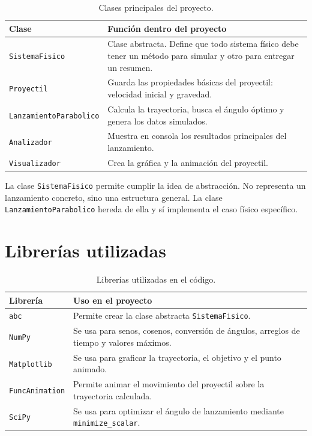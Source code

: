 \documentclass[12pt,letterpaper]{article}
\begin{document}
\begin{table}[H]
\centering
\begin{tabular}{p{4.2cm}p{10cm}}
\toprule
\textbf{Clase} & \textbf{Funci\'{o}n dentro del proyecto} \\
\midrule
\texttt{SistemaFisico} & Clase abstracta. Define que todo sistema f\'{i}sico debe tener un m\'{e}todo para simular y otro para entregar un resumen. \\
\texttt{Proyectil} & Guarda las propiedades b\'{a}sicas del proyectil: velocidad inicial y gravedad. \\
\texttt{LanzamientoParabolico} & Calcula la trayectoria, busca el \'{a}ngulo \'{o}ptimo y genera los datos simulados. \\
\texttt{Analizador} & Muestra en consola los resultados principales del lanzamiento. \\
\texttt{Visualizador} & Crea la gr\'{a}fica y la animaci\'{o}n del proyectil. \\
\bottomrule
\end{tabular}
\caption{Clases principales del proyecto.}
\end{table}

La clase \texttt{SistemaFisico} permite cumplir la idea de abstracci\'{o}n. No representa un lanzamiento concreto, sino una estructura general. La clase \texttt{LanzamientoParabolico} hereda de ella y s\'{i} implementa el caso f\'{i}sico espec\'{i}fico.

\section{Librer\'{i}as utilizadas}

\begin{table}[H]
\centering
\begin{tabular}{p{4cm}p{10cm}}
\toprule
\textbf{Librer\'{i}a} & \textbf{Uso en el proyecto} \\
\midrule
\texttt{abc} & Permite crear la clase abstracta \texttt{SistemaFisico}. \\
\texttt{NumPy} & Se usa para senos, cosenos, conversi\'{o}n de \'{a}ngulos, arreglos de tiempo y valores m\'{a}ximos. \\
\texttt{Matplotlib} & Se usa para graficar la trayectoria, el objetivo y el punto animado. \\
\texttt{FuncAnimation} & Permite animar el movimiento del proyectil sobre la trayectoria calculada. \\
\texttt{SciPy} & Se usa para optimizar el \'{a}ngulo de lanzamiento mediante \texttt{minimize\_scalar}. \\
\bottomrule
\end{tabular}
\caption{Librer\'{i}as utilizadas en el c\'{o}digo.}
\end{table}
\end{document}
